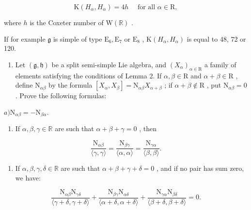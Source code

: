 \[
\mathrm{K} (H _ {\alpha}, H _ {\alpha}) = 4 h \quad \text { for   all } \alpha \in \mathrm{R},
\]

where \(h\) is the Coxeter number of \(\mathrm{W}(\mathbb{R})\) .

If for example \(\mathfrak{g}\) is simple of type \(\mathrm{E}_6, \mathrm{E}_7\) or \(\mathrm{E}_8\) , \(\mathrm{K}(H_{\alpha}, H_{\alpha})\) is equal to 48, 72 or 120.

\begin{enumerate}
\def\labelenumi{\arabic{enumi})}
\setcounter{enumi}{3}
\tightlist
\item
  Let \((\mathfrak{g},\mathfrak{h})\) be a split semi-simple Lie algebra, and \((X_{\alpha})_{\alpha \in \mathrm{R}}\) a family of elements satisfying the conditions of Lemma 2. If \(\alpha ,\beta \in \mathrm{R}\) and \(\alpha +\beta \in \mathrm{R}\) , define \(\mathrm{N}_{\alpha \beta}\) by the formula \([X_{\alpha},X_{\beta}] = \mathrm{N}_{\alpha \beta}X_{\alpha +\beta}\) ; if \(\alpha +\beta \notin \mathrm{R}\) , put \(\mathrm{N}_{\alpha \beta} = 0\) . Prove the following formulas:
\end{enumerate}

\(a)\mathrm{N}_{\alpha \beta} = -\mathrm{N}_{\beta \alpha}.\)

\begin{enumerate}
\def\labelenumi{\alph{enumi})}
\setcounter{enumi}{1}
\tightlist
\item
  If \(\alpha, \beta, \gamma \in \mathbb{R}\) are such that \(\alpha + \beta + \gamma = 0\) , then
\end{enumerate}

\[
\frac {\mathrm{N} _ {\alpha \beta}}{\langle \gamma , \gamma \rangle} = \frac {\mathrm{N} _ {\beta \gamma}}{\langle \alpha , \alpha \rangle} = \frac {\mathrm{N} _ {\gamma \alpha}}{\langle \beta , \beta \rangle}.
\]

\begin{enumerate}
\def\labelenumi{\alph{enumi})}
\setcounter{enumi}{2}
\tightlist
\item
  If \(\alpha, \beta, \gamma, \delta \in \mathbb{R}\) are such that \(\alpha + \beta + \gamma + \delta = 0\) , and if no pair has sum zero, we have:
\end{enumerate}

\[
\frac {\mathrm{N} _ {\alpha \beta} \mathrm{N} _ {\gamma \delta}}{\langle \gamma + \delta , \gamma + \delta \rangle} + \frac {\mathrm{N} _ {\beta \gamma} \mathrm{N} _ {\alpha \delta}}{\langle \alpha + \delta , \alpha + \delta \rangle} + \frac {\mathrm{N} _ {\gamma \alpha} \mathrm{N} _ {\beta \delta}}{\langle \beta + \delta , \beta + \delta \rangle} = 0.
\]

